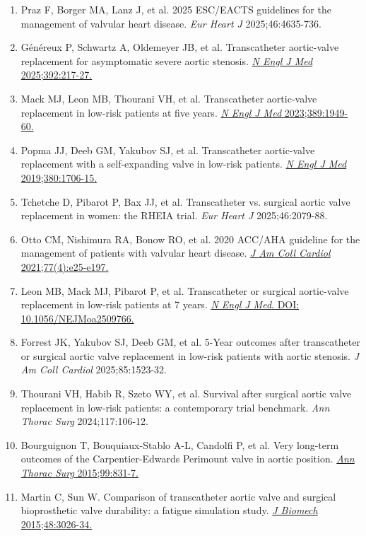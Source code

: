 \documentclass[12pt,a4paper]{article}
\begin{document}
\begin{enumerate}
    \item Praz F, Borger MA, Lanz J, et al. 2025 ESC/EACTS guidelines for the management of valvular heart disease. \textit{Eur Heart J} 2025;46:4635-736.

    \item Généreux P, Schwartz A, Oldemeyer JB, et al. Transcatheter aortic-valve replacement for asymptomatic severe aortic stenosis. \href{https://doi.org/10.1056/NEJMoa2408527}{\textit{N Engl J Med} 2025;392:217-27.}

    \item Mack MJ, Leon MB, Thourani VH, et al. Transcatheter aortic-valve replacement in low-risk patients at five years. \href{https://doi.org/10.1056/NEJMoa2307447}{\textit{N Engl J Med} 2023;389:1949-60.}

    \item Popma JJ, Deeb GM, Yakubov SJ, et al. Transcatheter aortic-valve replacement with a self-expanding valve in low-risk patients. \href{https://doi.org/10.1056/NEJMoa1816885}{\textit{N Engl J Med} 2019;380:1706-15.}

    \item Tchetche D, Pibarot P, Bax JJ, et al. Transcatheter vs. surgical aortic valve replacement in women: the RHEIA trial. \textit{Eur Heart J} 2025;46:2079-88.

    \item Otto CM, Nishimura RA, Bonow RO, et al. 2020 ACC/AHA guideline for the management of patients with valvular heart disease. \href{https://doi.org/10.1016/j.jacc.2020.11.018}{\textit{J Am Coll Cardiol} 2021;77(4):e25-e197.}

    \item Leon MB, Mack MJ, Pibarot P, et al. Transcatheter or surgical aortic-valve replacement in low-risk patients at 7 years. \href{https://doi.org/10.1056/NEJMoa2509766}{\textit{N Engl J Med}. DOI: 10.1056/NEJMoa2509766.}

    \item Forrest JK, Yakubov SJ, Deeb GM, et al. 5-Year outcomes after transcatheter or surgical aortic valve replacement in low-risk patients with aortic stenosis. \textit{J Am Coll Cardiol} 2025;85:1523-32.

    \item Thourani VH, Habib R, Szeto WY, et al. Survival after surgical aortic valve replacement in low-risk patients: a contemporary trial benchmark. \textit{Ann Thorac Surg} 2024;117:106-12.

    \item Bourguignon T, Bouquiaux-Stablo A-L, Candolfi P, et al. Very long-term outcomes of the Carpentier-Edwards Perimount valve in aortic position. \href{https://doi.org/10.1016/j.athoracsur.2014.09.030}{\textit{Ann Thorac Surg} 2015;99:831-7.}

    \item Martin C, Sun W. Comparison of transcatheter aortic valve and surgical bioprosthetic valve durability: a fatigue simulation study. \href{https://doi.org/10.1016/j.jbiomech.2015.07.031}{\textit{J Biomech} 2015;48:3026-34.}
\end{enumerate}
\end{document}
